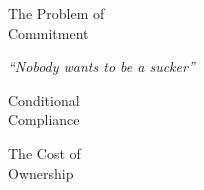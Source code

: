 \documentclass[18pt]{beamer}
\begin{document}
{
\begin{frame}[plain]
\end{frame}
}


{
\begin{frame}[plain]
\fontsize{36pt}{36pt}\selectfont
\center
\begin{center}
The Problem of\\
Commitment
\end{center}
\end{frame}
}


{
\color{white}
\begin{frame}[plain]
\Huge
\center
\begin{center}
\emph{``Nobody wants to be a sucker''}
\end{center}
\end{frame}
}


{
\color{white}
\begin{frame}[plain]
\Huge
\center
\begin{center}
Conditional\\
Compliance
\end{center}
\end{frame}
}


{
\color{white}
\begin{frame}[plain]
\Huge
\center
\begin{center}
The Cost of\\
Ownership
\end{center}
\end{frame}
}
\end{document}
